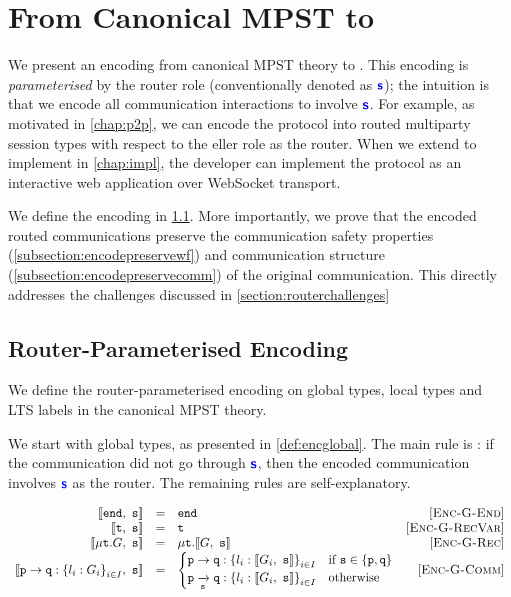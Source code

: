 \section{From Canonical MPST to \newtheory}
\label{section:encoding}

We present an encoding from canonical MPST theory
to \newtheory.
This encoding is \textit{parameterised} by the router role 
(conventionally denoted as $\role{s}$);
the intuition is that we encode all communication interactions
to involve $\role{s}$.
For example, as motivated in \cref{chap:p2p},
we can encode the  protocol
into routed multiparty session types with respect to the
eller role as the router.
When we extend \codegen to implement \newtheory in \cref{chap:impl},
the developer can implement the  protocol
as an interactive web application over WebSocket transport.

We define the encoding in \cref{subsection:encoding}.
More importantly, we prove that the encoded routed communications
preserve the communication safety
properties (\cref{subsection:encodepreservewf}) 
and communication structure (\cref{subsection:encodepreservecomm}) 
of the original 
communication. 
This directly addresses the challenges discussed in
\cref{section:routerchallenges}


\subsection{Router-Parameterised Encoding}
\label{subsection:encoding}

We define the router-parameterised encoding
on global types, local types and LTS labels in
the canonical MPST theory.

We start with global types, 
as presented in \cref{def:encglobal}.
The main rule is :
if the communication did not go through $\role{s}$,
then the encoded communication involves $\role{s}$ as the router.
The remaining rules are self-explanatory.

\begin{definition}

\doublespacing
\[
\begin{array}{rclr}
\enc{\tend}{s} &= & \tend & \rulename{Enc-G-End} \\
\enc{\trecvar}{s} &= & 
	\trecvar & \rulename{Enc-G-RecVar} \\
\enc{\trec{G}}{s} &= & 
	\trec{\enc{G}{s}} & \rulename{Enc-G-Rec} \\
\enc{\gcomm{p}{q}{l_i: G_i}{i \in I}}{s} &= & 
	\begin{cases}
	\gcomm{p}{q}{l_i: \enc{G_i}{s}}{i \in I} 
		& \text{if } \mrole{s} \in \{ \mrole{p}, \mrole{q} \} \\
	\groute{p}{q}{s}{l_i: \enc{G_i}{s}}{i \in I} 
		& \text{otherwise} \\	
	\end{cases} & \rulename{Enc-G-Comm} \\
\end{array}
\]
\singlespacing

\label{def:encglobal}
\end{definition}

